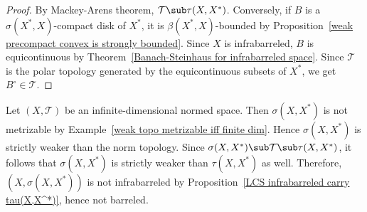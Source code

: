 \begin{proof}
By Mackey-Arens theorem, $\mathcal{T}\sub\tau(X,X^*)$. Conversely, if $B$ is a $\sigma(X^*,X)$-compact disk of $X^*$, it is $\beta(X^*,X)$-bounded by Proposition~\ref{weak precompact convex is strongly bounded}. Since $X$ is infrabarreled, $B$ is equicontinuous by Theorem~\ref{Banach-Steinhaus for infrabarreled space}. Since $\mathcal{T}$ is the polar topology generated by the equicontinuous subsets of $X^*$, we get $B^\circ\in\mathcal{T}$.
\end{proof}
\begin{example}\label{NVS infinite dim weak topo neq Mackey topo}
Let $(X,\mathcal{T})$ be an infinite-dimensional normed space. Then $\sigma(X,X^*)$ is not metrizable by Example~\ref{weak topo metrizable iff finite dim}. Hence $\sigma(X,X^*)$ is strictly weaker than the norm topology. Since $\sigma(X,X^*)\sub\mathcal{T}\sub\tau(X,X^*)$, it follows that $\sigma(X,X^*)$ is strictly weaker than $\tau(X,X^*)$ as well. Therefore, $(X,\sigma(X,X^*))$ is not infrabarreled by Proposition~\ref{LCS infrabarreled carry tau(X,X^*)}, hence not barreled.
\end{example}
